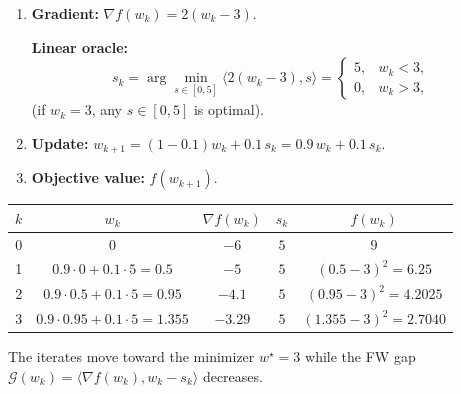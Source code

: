 \documentclass{article}
\newcommand{\grad}{\nabla}
\newcommand{\gap}{\mathcal{G}}
\begin{document}
\begin{enumerate}[label=Iteration \arabic*:, leftmargin=*, nosep]
\item \textbf{Gradient:} $\grad f(w_{k})=2(w_{k}-3)$.
    
    \textbf{Linear oracle:}
    \[
    s_{k}=\arg\min_{s\in[0,5]} \langle 2(w_{k}-3),s\rangle=
    \begin{cases}
      5, & w_{k}<3,\\
      0, & w_{k}>3,
    \end{cases}
    \]
    (if $w_{k}=3$, any $s\in[0,5]$ is optimal).

\item \textbf{Update:} $w_{k+1}= (1-0.1)w_{k}+0.1\,s_{k}=0.9\,w_{k}+0.1\,s_{k}$.

\item \textbf{Objective value:} $f(w_{k+1})$.
\end{enumerate}

\begin{center}
\begin{tabular}{c|c|c|c|c}
$k$ & $w_{k}$ & $\grad f(w_{k})$ & $s_{k}$ & $f(w_{k})$\\\hline
0 & $0$ & $-6$ & $5$ & $9$\\
1 & $0.9\cdot0+0.1\cdot5=0.5$ & $-5$ & $5$ & $(0.5-3)^{2}=6.25$\\
2 & $0.9\cdot0.5+0.1\cdot5=0.95$ & $-4.1$ & $5$ & $(0.95-3)^{2}=4.2025$\\
3 & $0.9\cdot0.95+0.1\cdot5=1.355$ & $-3.29$ & $5$ & $(1.355-3)^{2}=2.7040$
\end{tabular}
\end{center}
The iterates move toward the minimizer $w^{\star}=3$ while the FW gap $\gap(w_{k})=\langle \grad f(w_{k}),w_{k}-s_{k}\rangle$ decreases.
\end{document}
